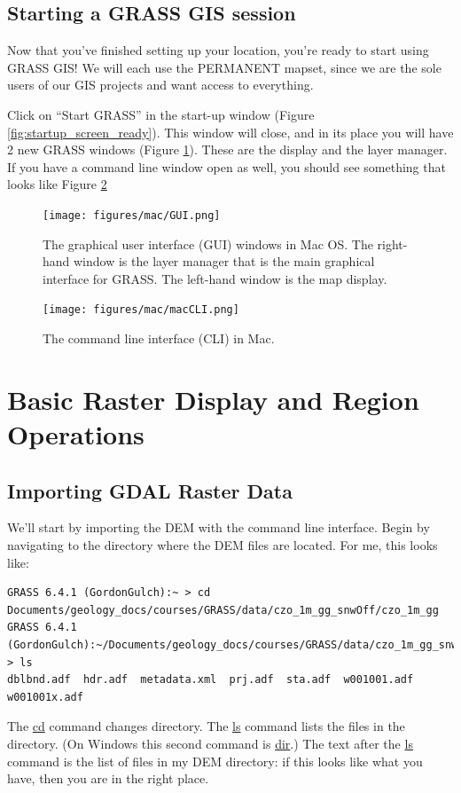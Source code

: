 \documentclass{book}
\begin{document}
\section{Starting a GRASS GIS session}

Now that you've finished setting up your location, you're ready to start using GRASS GIS! We will each use the PERMANENT mapset, since we are the sole users of our GIS projects and want access to everything.

Click on ``Start GRASS'' in the start-up window (Figure \ref{fig:startup_screen_ready}). This window will close, and in its place you will have 2 new GRASS windows (Figure \ref{fig:GUI}). These are the display and the layer manager. If you have a command line window open as well, you should see something that looks like Figure \ref{fig:macCLI}

\begin{figure}[h]
 \begin{center}
 \texttt{[image: figures/mac/GUI.png]}
 \caption{The graphical user interface (GUI) windows in Mac OS. The right-hand window is the layer manager that is the main graphical interface for GRASS. The left-hand window is the map display.}
 \label{fig:GUI}
 \end{center}
\end{figure}

\begin{figure}[h]
 \begin{center}
 \texttt{[image: figures/mac/macCLI.png]}
 \caption{The command line interface (CLI) in Mac.}
 \label{fig:macCLI}
 \end{center}
\end{figure}


\chapter{Basic Raster Display and Region Operations}

\section{Importing GDAL Raster Data \label{s:importgdal}}

We'll start by importing the DEM with the command line interface. Begin by navigating to the directory where the DEM files are located. For me, this looks like:
\begin{lstlisting}
GRASS 6.4.1 (GordonGulch):~ > cd Documents/geology_docs/courses/GRASS/data/czo_1m_gg_snwOff/czo_1m_gg
GRASS 6.4.1 (GordonGulch):~/Documents/geology_docs/courses/GRASS/data/czo_1m_gg_snwOff/czo_1m_gg > ls
dblbnd.adf  hdr.adf  metadata.xml  prj.adf  sta.adf  w001001.adf  w001001x.adf
\end{lstlisting}
The \url{cd} command changes directory. The \url{ls} command lists the files in the directory. (On Windows this second command is \url{dir}.) The text after the \url{ls} command is the list of files in my DEM directory: if this looks like what you have, then you are in the right place.
\end{document}
